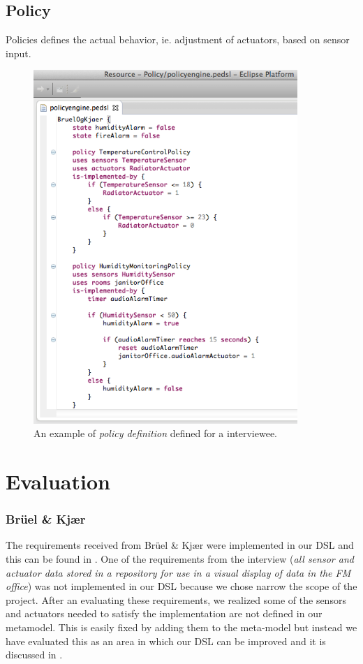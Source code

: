 \documentclass{llncs}
\begin{document}
\newpage
\subsection{Policy}\label{subsec:policies}
Policies defines the actual behavior, ie. adjustment of actuators, based on sensor input. 

\begin{figure}
  \centering
    \includegraphics[width=10cm]{dsl-policy-definition.png} 
	\caption{An example of \textit{policy definition} defined for a interviewee.}
	\label{fig:dsl-policy-definition}
\end{figure}

\newpage
\section{Evaluation}\label{sec:evaluation}

\subsubsection{Br\"{u}el \& Kj\ae r}\label{subsec:bruel}
The requirements received from Br\"{u}el \& Kj\ae r were implemented in our DSL and this can be found in . One of the requirements from the interview (\textit{all sensor and actuator data stored in a repository for use in a visual display of data in the FM office}) was not implemented in our DSL because we chose narrow the scope of the project. After an evaluating these requirements, we realized some of the sensors and actuators needed to satisfy the implementation are not defined in our metamodel. This is easily fixed by adding them to the meta-model but instead we have evaluated this as an area in which our DSL can be improved and it is discussed in .
\end{document}
